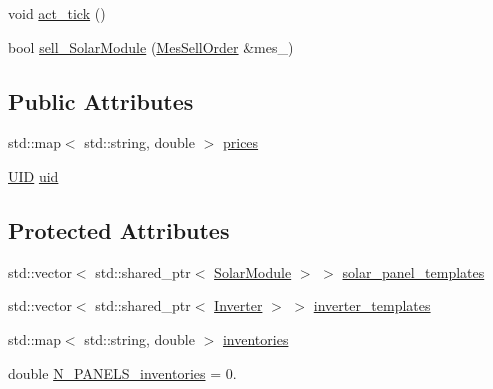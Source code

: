 {\bf }\par
\begin{DoxyCompactItemize}
\item 
void \hyperlink{classsolar__core_1_1_s_e_m_a797046cfc7b6150f44f49baa1b32abfc}{act\+\_\+tick} ()
\item 
bool \hyperlink{classsolar__core_1_1_s_e_m_a2717afd98e9ab7284df79945d882511a}{sell\+\_\+\+Solar\+Module} (\hyperlink{classsolar__core_1_1_mes_sell_order}{Mes\+Sell\+Order} \&mes\+\_\+)
\end{DoxyCompactItemize}

\subsection*{Public Attributes}
{\bf }\par
\begin{DoxyCompactItemize}
\item 
std\+::map$<$ std\+::string, double $>$ \hyperlink{classsolar__core_1_1_s_e_m_a69aaf0be4ed0edf8a52e48f97a0de5f6}{prices}
\end{DoxyCompactItemize}

{\bf }\par
\begin{DoxyCompactItemize}
\item 
\hyperlink{classsolar__core_1_1_u_i_d}{U\+I\+D} \hyperlink{classsolar__core_1_1_s_e_m_a9d8fcdda966f46763b83c280c4ba4dbf}{uid}
\end{DoxyCompactItemize}

\subsection*{Protected Attributes}
{\bf }\par
\begin{DoxyCompactItemize}
\item 
std\+::vector$<$ std\+::shared\+\_\+ptr$<$ \hyperlink{classsolar__core_1_1_solar_module}{Solar\+Module} $>$ $>$ \hyperlink{classsolar__core_1_1_s_e_m_adc6d6784a11bd0243efddbdc0d6e9bb0}{solar\+\_\+panel\+\_\+templates}
\item 
std\+::vector$<$ std\+::shared\+\_\+ptr$<$ \hyperlink{classsolar__core_1_1_inverter}{Inverter} $>$ $>$ \hyperlink{classsolar__core_1_1_s_e_m_acd9f1a494059476a06de5cb4fe9f750a}{inverter\+\_\+templates}
\item 
std\+::map$<$ std\+::string, double $>$ \hyperlink{classsolar__core_1_1_s_e_m_a2fa619a45dc7e3ecc29026042337bd2d}{inventories}
\item 
double \hyperlink{classsolar__core_1_1_s_e_m_a6822b2c6d30e2aaaf5dbe0b50ce221a1}{N\+\_\+\+P\+A\+N\+E\+L\+S\+\_\+inventories} = 0.
\end{DoxyCompactItemize}

